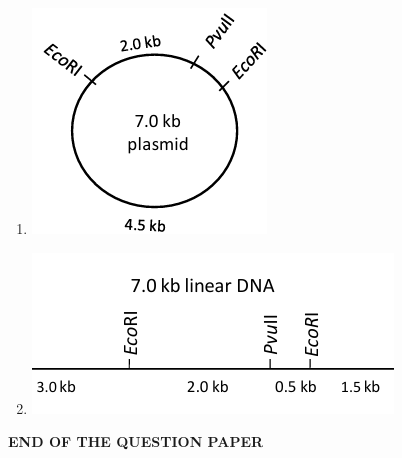 \documentclass[journal,12pt,onecolumn]{IEEEtran}
\theoremstyle{remark}
\begin{document}
\begin{enumerate}
\begin{multicols}{2}
\begin{enumerate}
\item \includegraphics[width=0.4\columnwidth]{fig31.png}
\item \includegraphics[width=0.5\columnwidth]{fig32.png}
\end{enumerate}
\end{multicols}

\end{enumerate}
\begin{center}
    \textbf{END OF THE QUESTION PAPER}
\end{center}
\clearpage
\end{document}
